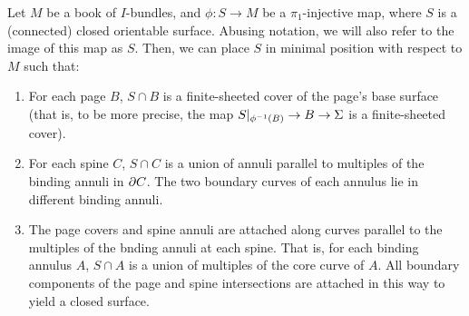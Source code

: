 \begin{lemma}

Let $M$ be a book of $I$-bundles, and $\phi\colon S \to M$ be
a $\pi_1$-injective map, where $S$ is a (connected) closed orientable surface.
Abusing notation, we will also refer to the image of this map as $S$. Then, we
can place $S$ in minimal position with respect to $M$ such that:

\begin{enumerate}

\item For each page $B$, $S \cap B$ is a finite-sheeted cover of the page's
base surface (that is, to be more precise, the map $S|_{\phi^{-1}(B)} \to B \to
\Sigma$ is a finite-sheeted cover).

\item For each spine $C$, $S \cap C$ is a union of annuli parallel to multiples
of the binding annuli in $\partial C$. The two boundary curves of each annulus lie
in different binding annuli.

\item The page covers and spine annuli are attached along curves parallel to
the multiples of the bnding annuli at each spine. That is, for each binding
annulus $A$, $S \cap A$ is a union of multiples of the core curve of $A$. All
boundary components of the page and spine intersections are attached in this
way to yield a closed surface.

\end{enumerate}

\end{lemma}

